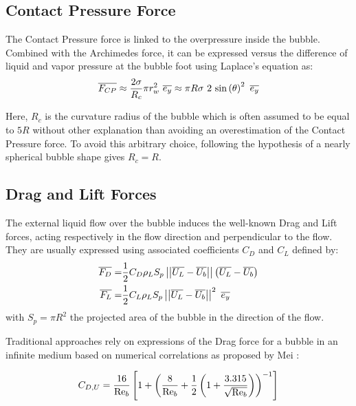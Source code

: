 \subsection{Contact Pressure Force}\label{subsec:FCP}

The Contact Pressure force is linked to the overpressure inside the bubble. Combined with the Archimedes force, it can be expressed versus the difference of liquid and vapor pressure at the bubble foot using Laplace's equation as:
\begin{align}
\overline{F_{CP}}  \approx \frac{2\sigma}{R_{c}} \pi r_{w}^{2}\  \overline{e_{y}}
\approx \pi R \sigma\ 2\ \mathrm{sin}\left( \theta \right)^{2}\ \overline{e_{y}}
\label{eq:FCP}
\end{align}

Here, $R_{c}$ is the curvature radius of the bubble which is often assumed to be equal to $5R$ \cite{klausner_vapor_1993, sugrue_modified_2016, mazzocco_reassessed_2018} without other explanation than avoiding an overestimation of the Contact Pressure force. To avoid this arbitrary choice, following the hypothesis of a nearly spherical bubble shape gives $R_{c}=R$.

\subsection{Drag and Lift Forces}\label{subsec:FD}

The external liquid flow over the bubble induces the well-known Drag and Lift forces, acting respectively in the flow direction and perpendicular to the flow. They are usually expressed using associated coefficients $C_{D}$ and $C_{L}$ defined by:
\begin{align}
\vect{F_{D}}=&\frac{1}{2}C_{D}\rho_{L}S_{p} \norm{ \vect{U_{L}}-\vect{U_{b}} } \parth{\vect{U_{L}}-\vect{U_{b}}} \\
\vect{F_{L}}=&\frac{1}{2}C_{L}\rho_{L}S_{p}\norm{\vect{U_{L}}-\vect{U_{b}}}^{2}\ \vect{e_{y}}
\end{align}
with $S_{p}=\pi R^{2}$ the projected area of the bubble in the direction of the flow.


Traditional approaches rely on expressions of the Drag force for a bubble in an infinite medium based on numerical correlations as proposed by Mei \cite{mei_unsteady_1992}: 

\begin{equation}
C_{D,U} = \frac{16}{\mathrm{Re}_{b}}\left[ 1 + \left( \frac{8}{\mathrm{Re}_{b}}+ \frac{1}{2}\left( 1+\frac{3.315}{\sqrt{\mathrm{Re}_{b}}}  \right) \right)^{-1}  \right]
\label{eq:CD_mei}
\end{equation}



